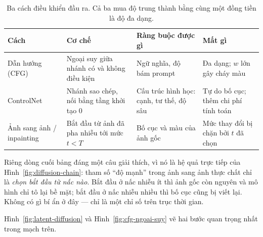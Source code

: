 \documentclass[../../../deep_learning.tex]{subfiles}
\begin{document}
\begin{table}[H]\centering\small
\caption{Ba cách điều khiển đầu ra. Cả ba mua độ trung thành bằng cùng một đồng tiền là độ đa dạng.}
\label{tab:dieu-khien-diffusion}
\begin{tabularx}{\linewidth}{@{}L{2.4cm}YYL{2.6cm}@{}}
\toprule
\textbf{Cách} & \textbf{Cơ chế} & \textbf{Ràng buộc được gì} & \textbf{Mất gì}\\
\midrule
Dẫn hướng (CFG) & Ngoại suy giữa nhánh có và không điều kiện & Ngữ nghĩa, độ bám prompt & Đa dạng; \(w\) lớn gây cháy màu\\
ControlNet & Nhánh sao chép, nối bằng tầng khởi tạo 0 & Cấu trúc hình học: cạnh, tư thế, độ sâu & Tự do bố cục; thêm chi phí tính toán\\
Ảnh sang ảnh / inpainting & Bắt đầu từ ảnh đã pha nhiễu tới mức \(t<T\) & Bố cục và màu của ảnh gốc & Mức thay đổi bị chặn bởi \(t\) đã chọn\\
\bottomrule
\end{tabularx}
\end{table}

Riêng dòng cuối bảng đáng một câu giải thích, vì nó là hệ quả trực tiếp của Hình~\ref{fig:diffusion-chain}: tham số ``độ mạnh'' trong ảnh sang ảnh thực chất chỉ là \emph{chọn bắt đầu từ nấc nào}. Bắt đầu ở nấc nhiễu ít thì ảnh gốc còn nguyên và mô hình chỉ tô lại bề mặt; bắt đầu ở nấc nhiễu nhiều thì bố cục cũng bị viết lại. Không có gì bí ẩn ở đây --- chỉ là một chỉ số trên trục thời gian.

Hình~\ref{fig:latent-diffusion} và Hình~\ref{fig:cfg-ngoai-suy} vẽ hai bước quan trọng nhất trong mạch trên.
\end{document}
